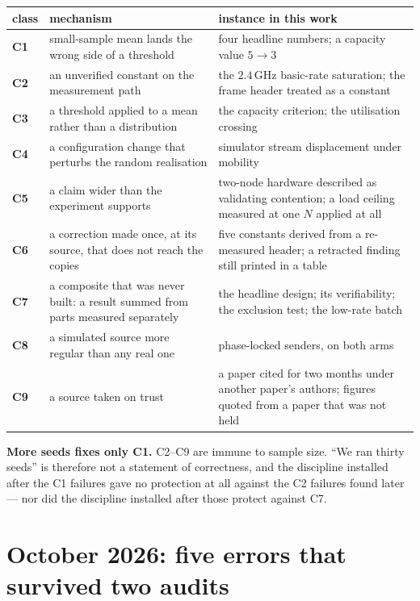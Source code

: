 \begin{center}
\begin{tabular}{p{2.2cm}p{5.6cm}p{5.2cm}}
\toprule
class & mechanism & instance in this work \\
\midrule
\textbf{C1} & small-sample mean lands the wrong side of a threshold & four headline numbers; a
capacity value $5 \rightarrow 3$ \\
\textbf{C2} & an unverified constant on the measurement path & the $2.4$\,GHz basic-rate
saturation; the frame header treated as a constant \\
\textbf{C3} & a threshold applied to a mean rather than a distribution & the capacity criterion;
the utilisation crossing \\
\textbf{C4} & a configuration change that perturbs the random realisation & simulator stream
displacement under mobility \\
\textbf{C5} & a claim wider than the experiment supports & two-node hardware described as
validating contention; a load ceiling measured at one $N$ applied at all \\
\textbf{C6} & a correction made once, at its source, that does not reach the copies & five
constants derived from a re-measured header; a retracted finding still printed in a table \\
\textbf{C7} & a composite that was never built: a result summed from parts measured separately &
the headline design; its verifiability; the exclusion test; the low-rate batch \\
\textbf{C8} & a simulated source more regular than any real one & phase-locked senders, on both
arms \\
\textbf{C9} & a source taken on trust & a paper cited for two months under another paper's
authors; figures quoted from a paper that was not held \\
\bottomrule
\end{tabular}
\end{center}

\begin{remark}
\textbf{More seeds fixes only C1.} C2--C9 are immune to sample size. ``We ran thirty seeds'' is
therefore not a statement of correctness, and the discipline installed after the C1 failures gave
no protection at all against the C2 failures found later --- nor did the discipline installed
after those protect against C7.
\end{remark}

\section{October 2026: five errors that survived two audits}\label{sec:october}

